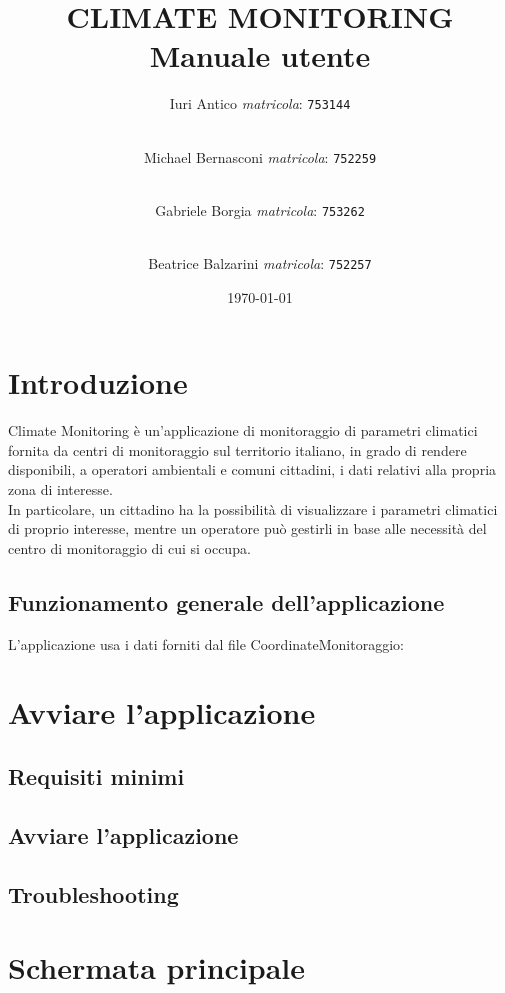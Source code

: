 \documentclass[a4paper, 12pt,twoside]{article}
\title {
	CLIMATE MONITORING \\
	{Manuale utente}}
\author{
	Iuri Antico \textit{matricola}:
	\texttt{753144}
	\and \\
	Michael Bernasconi \textit{matricola}:
	\texttt{752259}
	\and \\
	Gabriele Borgia \textit{matricola}:
	\texttt{753262}
	\and \\
	Beatrice Balzarini \textit{matricola}:
	\texttt{752257}
}
\date{\today}
\begin{document}
	
	\makeatletter
	\begin{titlepage}
		\maketitle
	\end{titlepage}
	\makeatother

	\tableofcontents

	\newpage
	
	\section{Introduzione}
	Climate Monitoring è un'applicazione di monitoraggio di parametri climatici fornita da centri di monitoraggio sul territorio italiano, in grado di rendere disponibili, a operatori ambientali e comuni cittadini, i dati relativi alla propria zona di interesse. \\	
	In particolare, un cittadino ha la possibilità di visualizzare i parametri climatici di proprio interesse, mentre un operatore può gestirli in base alle necessità del centro di monitoraggio di cui si occupa.
	
		\subsection{Funzionamento generale dell'applicazione}
		L'applicazione usa i dati forniti dal file CoordinateMonitoraggio:
		
			
	\section{Avviare l'applicazione}
	
		\subsection{Requisiti minimi}
		
		\subsection{Avviare l'applicazione}
		
		\subsection{Troubleshooting}
		
	\section{Schermata principale}
	
\end{document}
